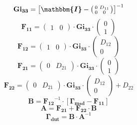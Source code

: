 \[ \mathbf{Gi_{33}} = \left[\boldsymbol{\mathbbm{I}}
-\left(\begin{smallmatrix} 0 & D_{11} \\ 0 & 0
\end{smallmatrix}\right)\right]^{-1} \]
\[ \mathbf{F_{11}} = \left(\begin{smallmatrix} 1 & 0
\end{smallmatrix}\right) \cdot\mathbf{Gi_{33}}\cdot
\left(\begin{smallmatrix} 0 \\ 1 \end{smallmatrix}\right) \]
\[ \mathbf{F_{12}} = \left(\begin{smallmatrix} 1 & 0
\end{smallmatrix}\right) \cdot\mathbf{Gi_{33}}\cdot
\left(\begin{smallmatrix} D_{12} \\ 0 \end{smallmatrix}\right) \]
\[ \mathbf{F_{21}} = \left(\begin{smallmatrix} 0 & D_{21}
\end{smallmatrix}\right) \cdot\mathbf{Gi_{33}}\cdot
\left(\begin{smallmatrix} 0 \\ 1 \end{smallmatrix}\right) \]
\[ \mathbf{F_{22}} = \left(\begin{smallmatrix} 0 & D_{21}
\end{smallmatrix}\right) \cdot\mathbf{Gi_{33}}\cdot
\left(\begin{smallmatrix} D_{12} \\ 0 \end{smallmatrix}\right) +
D_{22} \]
\[ \mathbf{B}=\mathbf{F_{12}}^{-1}\cdot\left[ \mathbf{\Gamma_{msd}} -
\mathbf{F_{11}} \right]  \]
\[ \mathbf{A}=\mathbf{F_{21}}+ \mathbf{F_{22}}\cdot\mathbf{B} \]
\[ \mathbf{\Gamma_{dut}} = \mathbf{B} \cdot \mathbf{A}^{-1} \]
